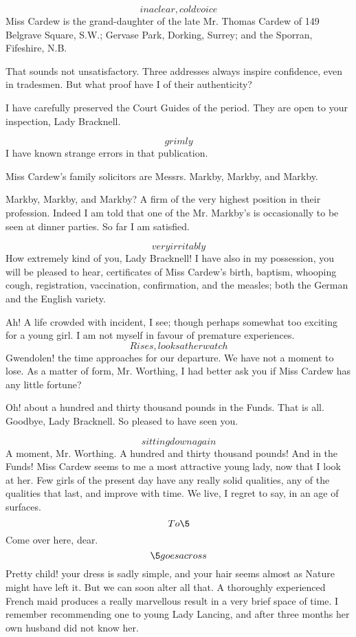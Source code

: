 \documentclass{book}
\begin{document}
\1  \[in a clear, cold voice\]  Miss Cardew is the grand-daughter
of the late Mr. Thomas Cardew of 149 Belgrave Square, S.W.; Gervase
Park, Dorking, Surrey; and the Sporran, Fifeshire, N.B.

\3  That sounds not unsatisfactory.  Three addresses
always inspire confidence, even in tradesmen.  But what proof have
I of their authenticity?

\1  I have carefully preserved the Court Guides of the period.
They are open to your inspection, Lady Bracknell.

\3  \[grimly\]  I have known strange errors in that
publication.

\1  Miss Cardew's family solicitors are Messrs. Markby, Markby,
and Markby.

\3  Markby, Markby, and Markby?  A firm of the very
highest position in their profession.  Indeed I am told that one of
the Mr. Markby's is occasionally to be seen at dinner parties.  So
far I am satisfied.

\1  \[very irritably\]  How extremely kind of you, Lady
Bracknell!  I have also in my possession, you will be pleased to
hear, certificates of Miss Cardew's birth, baptism, whooping cough,
registration, vaccination, confirmation, and the measles; both the
German and the English variety.

\3  Ah! A life crowded with incident, I see; though
perhaps somewhat too exciting for a young girl.  I am not myself in
favour of premature experiences.  \[Rises, looks at her watch\]
Gwendolen! the time approaches for our departure.  We have not a
moment to lose.  As a matter of form, Mr. Worthing, I had better
ask you if Miss Cardew has any little fortune?

\1  Oh! about a hundred and thirty thousand pounds in the Funds.
That is all.  Goodbye, Lady Bracknell.  So pleased to have seen
you.

\3  \[sitting down again\]  A moment, Mr. Worthing.  A
hundred and thirty thousand pounds!  And in the Funds!  Miss Cardew
seems to me a most attractive young lady, now that I look at her.
Few girls of the present day have any really solid qualities, any
of the qualities that last, and improve with time.  We live, I
regret to say, in an age of surfaces.  \[To \5\]  Come over
here, dear.  \[\5 goes across\]  Pretty child! your dress is
sadly simple, and your hair seems almost as Nature might have left
it.  But we can soon alter all that.  A thoroughly experienced
French maid produces a really marvellous result in a very brief
space of time.  I remember recommending one to young Lady Lancing,
and after three months her own husband did not know her.
\end{document}
